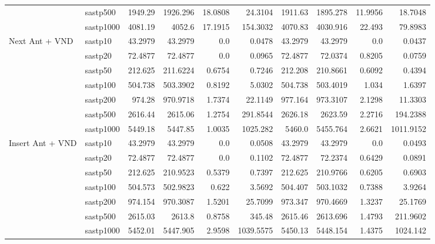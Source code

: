 \documentclass{article}
\begin{document}
\begin{table}[b!]
{\begin{tabular}{p{1.6cm}|l||rrrr|rrrr}
  & sastp500 & 1949.29 & 1926.296 & 18.0808 & 24.3104 &
               1911.63 & 1895.278 & 11.9956 & 18.7048 \\
  & sastp1000 & 4081.19 & 4052.6 & 17.1915 & 154.3032 &
                4070.83 & 4030.916 & 22.493 & 79.8983 \\
    \hline
\multirow{7}{*}{\vbox{Next Ant + VND}}
  & sastp10 & 43.2979 & 43.2979 & 0.0 & 0.0478 & 
              43.2979 & 43.2979 & 0.0 & 0.0437 \\ 
  & sastp20 & 72.4877 & 72.4877 & 0.0 & 0.0965 &
              72.4877 & 72.0374 & 0.8205 & 0.0759 \\ 
  & sastp50 & 212.625 & 211.6224 & 0.6754 & 0.7246 & 
              212.208 & 210.8661 & 0.6092 & 0.4394 \\ 
  & sastp100 & 504.738 & 503.3902 & 0.8192 & 5.0302 & 
               504.738 & 503.4019 & 1.034 & 1.6397 \\ 
  & sastp200 & 974.28 & 970.9718 & 1.7374 & 22.1149 & 
               977.164 & 973.3107 & 2.1298 & 11.3303 \\ 
  & sastp500 & 2616.44 & 2615.06 & 1.2754 & 291.8544 & 
               2626.18 & 2623.59 & 2.2716 & 194.2388 \\ 
  & sastp1000 & 5449.18 & 5447.85 & 1.0035 & 1025.282 &
                 5460.0 & 5455.764 & 2.6621 & 1011.9152 \\
    \hline
\multirow{7}{*}{\vbox{Insert Ant + VND}}
  & sastp10 & 43.2979 & 43.2979 & 0.0 & 0.0508 &
              43.2979 & 43.2979 & 0.0 & 0.0493 \\
  & sastp20 & 72.4877 & 72.4877 & 0.0 & 0.1102 &
              72.4877 & 72.2374 & 0.6429 & 0.0891 \\
  & sastp50 & 212.625 & 210.9523 & 0.5379 & 0.7397 &
              212.625 & 210.9766 & 0.6205 & 0.6903 \\
  & sastp100 & 504.573 & 502.9823 & 0.622 & 3.5692 &
               504.407 & 503.1032 & 0.7388 & 3.9264 \\
  & sastp200 & 974.154 & 970.3087 & 1.5201 & 25.7099 &
               973.347 & 970.4669 & 1.3237 & 25.1769 \\
  & sastp500 & 2615.03 & 2613.8 & 0.8758 & 345.48 &
               2615.46 & 2613.696 & 1.4793 & 211.9602 \\
  & sastp1000 & 5452.01 & 5447.905 & 2.9598 & 1039.5575 &
                5450.13 & 5448.154 & 1.4375 & 1024.142 \\
    \hline
  \end{tabular}
  }
\end{table}
\end{document}

